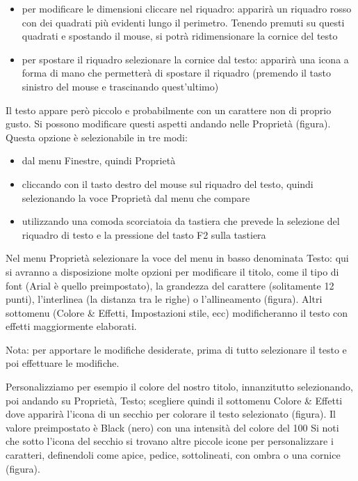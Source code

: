 \documentclass[a4paper, 12pt]{book}
\begin{document}
\begin{itemize}
	\item per modificare le dimensioni cliccare nel riquadro: apparirà un riquadro rosso con dei quadrati più evidenti lungo il perimetro. Tenendo premuti su questi quadrati e spostando il mouse, si potrà ridimensionare la cornice del testo

	\item per spostare il riquadro selezionare la cornice dal testo: apparirà una icona a forma di mano che permetterà di spostare il riquadro (premendo il tasto sinistro del mouse e trascinando quest'ultimo)
\end{itemize}

Il testo appare però piccolo e probabilmente con un carattere non di proprio gusto. Si possono modificare questi aspetti andando nelle Proprietà (figura). Questa opzione è selezionabile in tre modi:

\begin{itemize}
	\item dal menu Finestre, quindi Proprietà

	\item cliccando con il tasto destro del mouse sul riquadro del testo, quindi selezionando la voce Proprietà dal menu che compare

	\item utilizzando una comoda scorciatoia da tastiera che prevede la selezione del riquadro di testo e la pressione del tasto F2 sulla tastiera
\end{itemize}

Nel menu Proprietà selezionare la voce del menu in basso denominata Testo: qui si avranno a disposizione molte opzioni per modificare il titolo, come il tipo di font (Arial è quello preimpostato), la grandezza del carattere (solitamente 12 punti), l'interlinea (la distanza tra le righe) o l'allineamento (figura). Altri sottomenu (Colore \& Effetti, Impostazioni stile, ecc) modificheranno il testo con effetti maggiormente elaborati.
 
Nota: per apportare le modifiche desiderate, prima di tutto selezionare il testo e poi effettuare le modifiche.

Personalizziamo per esempio il colore del nostro titolo, innanzitutto selezionando, poi andando su Proprietà, Testo; scegliere quindi il sottomenu Colore \& Effetti dove apparirà l'icona di un secchio per colorare il testo selezionato (figura). Il valore preimpostato è Black (nero) con una intensità del colore del 100%
Si noti che sotto l'icona del secchio si trovano altre piccole icone per personalizzare i caratteri, definendoli come apice, pedice, sottolineati, con ombra o una cornice (figura).
\end{document}
